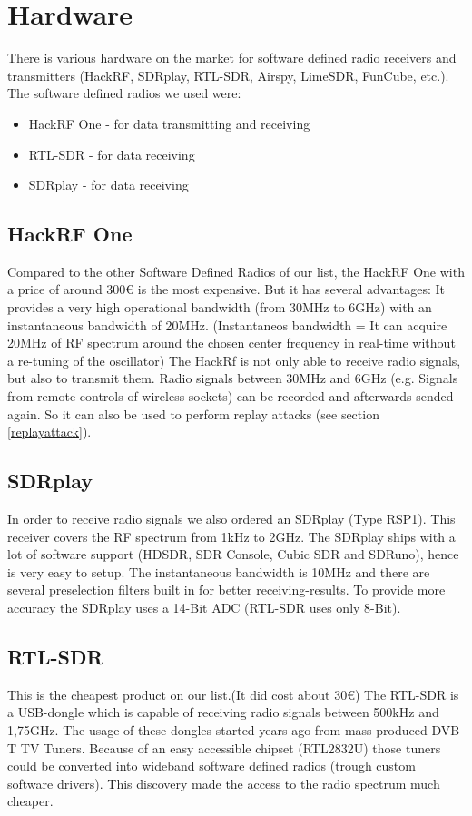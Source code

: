 \documentclass[conference]{IEEEtran}
\begin{document}
\section{Hardware}
There is various hardware on the market for software defined radio receivers and transmitters (HackRF, SDRplay, RTL-SDR, Airspy, LimeSDR, FunCube, etc.). The software defined radios we used were:
\begin{itemize}
	\item HackRF One - for data transmitting and receiving
	\item RTL-SDR - for data receiving
	\item SDRplay - for data receiving
\end{itemize}

\subsection{HackRF One}
Compared to the other Software Defined Radios of our list, the HackRF One with a price of around 300€ is the most expensive. But it has several advantages: It provides a very high operational bandwidth (from 30MHz to 6GHz) with an instantaneous bandwidth of 20MHz. (Instantaneos bandwidth = It can acquire 20MHz of RF spectrum around the chosen center frequency in real-time without a re-tuning of the oscillator) \cite[Kap. 2.5]{Mishra2014} The HackRf is not only able to receive radio signals, but also to transmit them. Radio signals between 30MHz and 6GHz (e.g. Signals from remote controls of wireless sockets) can be recorded and afterwards sended again. So it can also be used to perform replay attacks (see section \ref{replayattack}).  \\

\subsection{SDRplay}
In order to receive radio signals we also ordered an SDRplay (Type RSP1). This receiver covers the RF spectrum from 1kHz to 2GHz. The SDRplay ships with  a lot of software support (HDSDR, SDR Console, Cubic SDR and SDRuno), hence is very easy to setup. The instantaneous bandwidth is 10MHz and there are several preselection filters built in for better receiving-results. To provide more accuracy the SDRplay uses a 14-Bit ADC (RTL-SDR uses only 8-Bit).
\cite{sdrplay}
\\
\subsection{RTL-SDR}
This is the cheapest product on our list.(It did cost about 30€) The RTL-SDR is a USB-dongle which is capable of receiving radio signals  between 500kHz and 1,75GHz.  The  usage of these dongles started years ago from mass produced DVB-T TV Tuners. Because of an easy accessible chipset (RTL2832U) those tuners could be converted into wideband software defined radios (trough custom software drivers). This discovery made the access to the radio spectrum much cheaper. \cite{rtl-sdr}
\end{document}
